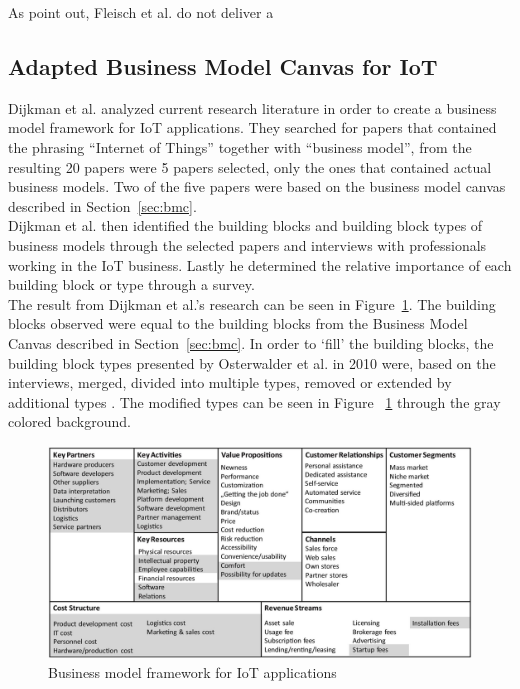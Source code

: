 		As point out, Fleisch et al. do not deliver a 


	\subsection{Adapted Business Model Canvas for IoT}
		Dijkman et al. \cite{dijkman} analyzed current research literature in order to create a business model framework for IoT applications. They searched for papers that contained the phrasing ``Internet of Things'' together with ``business model'', from the resulting 20 papers were 5 papers selected, only the ones that contained actual business models. Two of the five papers were based on the business model canvas described in Section~\ref{sec:bmc}.\\
		Dijkman et al.  then identified the building blocks and building block types of business models through the selected papers and interviews with professionals working in the IoT business. Lastly he determined the relative importance of each building block or type through a survey.\\
		The result from Dijkman et al.'s research can be seen in Figure~\ref{fig:bm_dijkman}. The building blocks observed were equal to the building blocks from the Business Model Canvas described in Section~\ref{sec:bmc}. In order to `fill' the building blocks, the building block types presented by Osterwalder et al. in 2010 were, based on the interviews, merged, divided into multiple types, removed or extended by additional types \cite{osterwalder2010} \cite{dijkman}. The modified types can be seen in Figure ~\ref{fig:bm_dijkman} through the gray colored background.  

		\begin{figure}[ht]
			\begin{center}
		    \includegraphics[scale=0.52]{Talk11/iot_canvas_dijkman.jpg}
		    \end{center}
		    \caption{Business model framework for IoT applications}
		    \label{fig:bm_dijkman}
		\end{figure}

